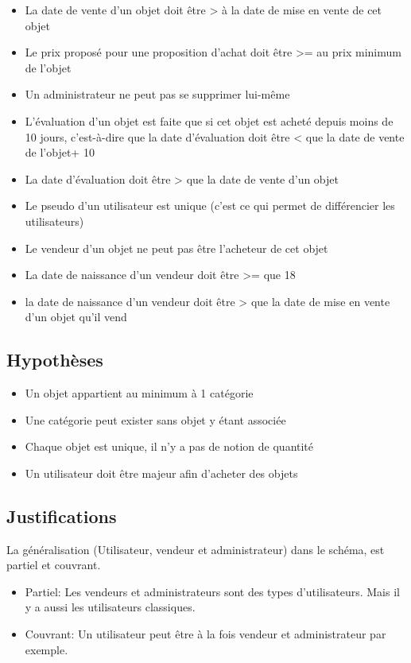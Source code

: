 \documentclass{article}
\begin{document}
\begin{itemize} [label=\textbullet]
	\item La date de vente d'un objet doit être > à la date de mise en vente de cet objet
	\item Le prix proposé pour une proposition d'achat doit être >= au prix minimum de l'objet
	\item Un administrateur ne peut pas se supprimer lui-même
	\item L'évaluation d'un objet est faite que si cet objet est acheté depuis moins de 10 jours, c'est-à-dire que la date d'évaluation doit être < que la date de vente de l'objet+ 10
	\item La date d'évaluation doit être > que la date de vente d'un objet
	\item Le pseudo d'un utilisateur est unique (c'est ce qui permet de différencier les utilisateurs)
	\item Le vendeur d'un objet ne peut pas être l'acheteur de cet objet
	\item La date de naissance d'un vendeur doit être >= que 18
	\item la date de naissance d'un vendeur doit être > que la date de mise en vente d'un objet qu'il vend
	
\end{itemize}

\subsection{Hypothèses}

\begin{itemize}[label=\textbullet]
	\item Un objet appartient au minimum à 1 catégorie
	\item Une catégorie peut exister sans objet y étant associée
	\item Chaque objet est unique, il n'y a pas de notion de quantité
	\item Un utilisateur doit être majeur afin d'acheter des objets

\end{itemize}

\subsection{Justifications}
La généralisation (Utilisateur, vendeur et administrateur) dans le schéma, est partiel et couvrant.
\begin{itemize}

\item Partiel: Les vendeurs et administrateurs sont des types d'utilisateurs. Mais il y a aussi les utilisateurs classiques.

\item Couvrant: Un utilisateur peut être à la fois vendeur et administrateur par exemple.

\end{itemize}
\end{document}
